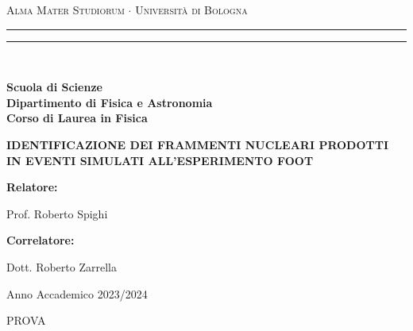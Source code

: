 \documentclass[12pt,a4paper,twoside]{report}
\newenvironment{dedication}{
	\clearpage           %
	\thispagestyle{empty}%
	\vspace*{\stretch{1}}%
	\itshape             %
	\raggedleft          %
}
{\par %
	\vspace{\stretch{3}} %
	\clearpage           %
}
\begin{document}
	\begin{titlepage}
		\begin{center}
			{{\Large{\textsc{Alma Mater Studiorum $\cdot$ Universit\`a di Bologna}}}} 
			\rule[0.1cm]{15.8cm}{0.1mm}
			\rule[0.5cm]{15.8cm}{0.6mm}
			\\\vspace{3mm}
			
			{\small{\bf Scuola di Scienze \\ 
					Dipartimento di Fisica e Astronomia\\
					Corso di Laurea in Fisica}}
			
		\end{center}
		
		\vspace{23mm}
		
		\begin{center}
			\doublespacing
			{\LARGE{\bf IDENTIFICAZIONE DEI FRAMMENTI NUCLEARI PRODOTTI IN EVENTI SIMULATI ALL'ESPERIMENTO FOOT}}\\
		\end{center}
		
		\vspace{35mm} \par \noindent
		
		\begin{minipage}[t]{0.47\textwidth}
			{\large{\bf Relatore: \vspace{3mm}
					
					Prof. Roberto Spighi}}
		\end{minipage}
		\hfill
		\begin{minipage}[t]{0.47\textwidth}
		\end{minipage}
		
		\par
		\vspace{\baselineskip}
		
		\begin{minipage}[t]{0.47\textwidth}
			{\large{\bf Correlatore: \vspace{3mm}
					
					Dott. Roberto Zarrella}}
		\end{minipage}
		
		\vspace{45mm}
		
		\begin{center}
			Anno Accademico { 2023/2024}
		\end{center}
		
	\end{titlepage}
	\newpage
	\onehalfspacing %
	\begin{dedication}
		PROVA
	\end{dedication}
\end{document}
